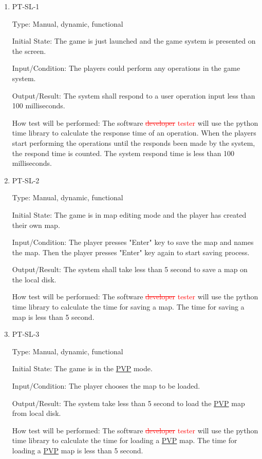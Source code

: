 \documentclass[12pt, titlepage]{article}
\begin{document}
\begin{enumerate}

\item{PT-SL-1\\}

Type: Manual, dynamic, functional
					
Initial State: The game is just launched and the game system is presented on the screen.
					
Input/Condition: The players could perform any operations in the game system.
					
Output/Result: The system shall respond to a user operation input less than 100 milliseconds.
					
How test will be performed: The software  \textcolor{red}{\sout{developer} tester} will use the python time library to calculate the response time of an operation. When the players start performing the operations until the responds been made by the system, the respond time is counted. The system respond time is less than 100 milliseconds.

\item{PT-SL-2\\}

Type: Manual, dynamic, functional
					
Initial State: The game is in map editing mode and the player has created their own map.
					
Input/Condition: The player presses "Enter" key to save the map and names the map. Then the player presses "Enter" key again to start saving process.
					
Output/Result: The system shall take less than 5 second to save a map on the local disk.
					
How test will be performed: The software  \textcolor{red}{\sout{developer} tester} will use the python time library to calculate the time for saving a map. The time for saving a map is less than 5 second.

\item{PT-SL-3\\}

Type: Manual, dynamic, functional
					
Initial State: The game is in the \underline{PVP} mode. 
					
Input/Condition: The player chooses the map to be loaded.
					
Output/Result: The system take less than 5 second to load the \underline{PVP} map from local disk.
					
How test will be performed: The software  \textcolor{red}{\sout{developer} tester} will use the python time library to calculate the time for loading a \underline{PVP} map. The time for loading a \underline{PVP} map is less than 5 second.


\end{enumerate}
\end{document}
